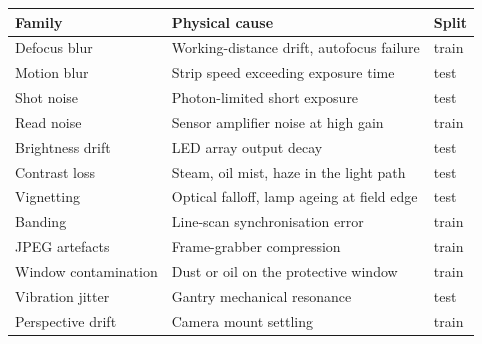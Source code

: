 \begin{tabular}{lll}
\toprule
Family & Physical cause & Split \\
\midrule
Defocus blur & Working-distance drift, autofocus failure & train \\
Motion blur & Strip speed exceeding exposure time & test \\
Shot noise & Photon-limited short exposure & test \\
Read noise & Sensor amplifier noise at high gain & train \\
Brightness drift & LED array output decay & test \\
Contrast loss & Steam, oil mist, haze in the light path & test \\
Vignetting & Optical falloff, lamp ageing at field edge & test \\
Banding & Line-scan synchronisation error & train \\
JPEG artefacts & Frame-grabber compression & train \\
Window contamination & Dust or oil on the protective window & train \\
Vibration jitter & Gantry mechanical resonance & test \\
Perspective drift & Camera mount settling & train \\
\bottomrule
\end{tabular}
